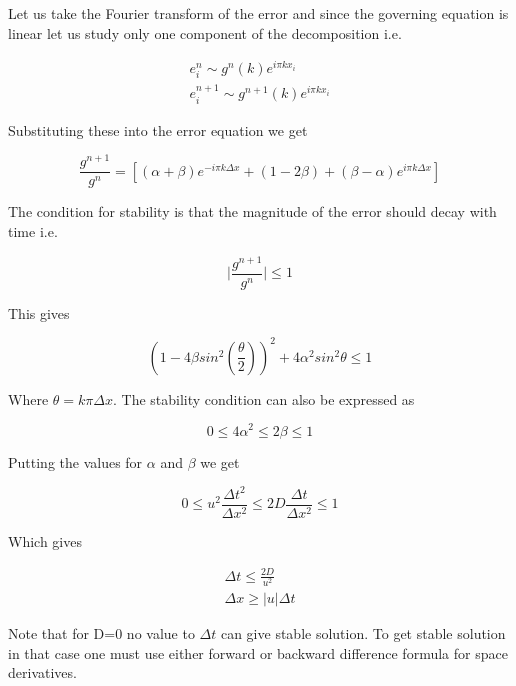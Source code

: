 \documentclass{article}		%
\begin{document}
Let us take the Fourier transform of the error and since the governing equation is linear let us study only one component of the decomposition i.e. 

\begin{eqnarray}
e_i^n \sim g^n(k) e^{i \pi k x_i}\\
e_i^{n+1} \sim g^{n+1}(k) e^{i \pi k x_i}
\end{eqnarray}

Substituting these into the error equation we get 

\begin{equation}
\frac{g^{n+1}}{g^n} = \left[ (\alpha + \beta ) e^{-i\pi k \Delta x} + (1- 2\beta) + (\beta - \alpha) e^{i\pi k \Delta x}\right]
\end{equation}


The condition for stability is that the magnitude of the error should decay with time i.e.

\begin{equation}
 \bigg| \frac{g^{n+1}}{g^n}  \bigg| \le 1 
\end{equation}

This gives 

\begin{equation}
\left( 1 - 4\beta sin^2\left( \frac{\theta}{2}  \right)  \right)^2 + 4 \alpha^2 sin^2 \theta  \le 1 
\end{equation}

Where $\theta  = k \pi \Delta x$. The stability condition can also be expressed as 

\begin{equation}
0 \le 4 \alpha^2 \le 2 \beta \le 1 
\end{equation}

Putting the values for $\alpha$ and $ \beta $ we get 

\begin{equation}
0 \le u^2  \frac{\Delta t^2}{ \Delta x^2} \le 2 D \frac{\Delta t }{\Delta x^2} \le 1 
\end{equation}

Which gives 

\begin{eqnarray}
\Delta t  \le \frac{2D}{u^2}\\
\Delta x \ge |u| \Delta t
\end{eqnarray}

Note that for D=0 no value to $\Delta t $ can give stable solution. To get stable solution in that case one must use either forward or backward difference formula for space derivatives.
\end{document}

